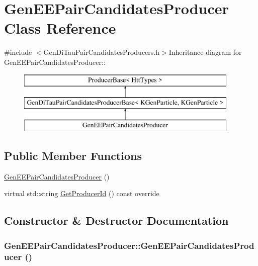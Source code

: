 \hypertarget{classGenEEPairCandidatesProducer}{
\section{GenEEPairCandidatesProducer Class Reference}
\label{classGenEEPairCandidatesProducer}
}


{\ttfamily \#include $<$GenDiTauPairCandidatesProducers.h$>$}Inheritance diagram for GenEEPairCandidatesProducer::\begin{figure}[H]
\begin{center}
\leavevmode
\includegraphics[height=3cm]{classGenEEPairCandidatesProducer}
\end{center}
\end{figure}
\subsection*{Public Member Functions}
\begin{DoxyCompactItemize}
\item 
\hyperlink{classGenEEPairCandidatesProducer_a40f711be0d9d647f9222fcd9ec87a014}{GenEEPairCandidatesProducer} ()
\item 
virtual std::string \hyperlink{classGenEEPairCandidatesProducer_afd5130afa3dfb2d2d02113e73e1ff35e}{GetProducerId} () const override
\end{DoxyCompactItemize}


\subsection{Constructor \& Destructor Documentation}
\hypertarget{classGenEEPairCandidatesProducer_a40f711be0d9d647f9222fcd9ec87a014}{
\subsubsection[{GenEEPairCandidatesProducer}]{\setlength{\rightskip}{0pt plus 5cm}GenEEPairCandidatesProducer::GenEEPairCandidatesProducer ()}}
\label{classGenEEPairCandidatesProducer_a40f711be0d9d647f9222fcd9ec87a014}



